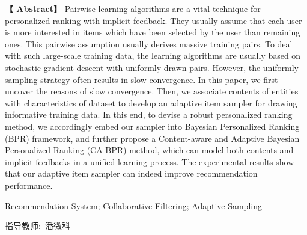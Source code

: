 \newpage

\centerline{\fangsong\bf{}}


\vskip 20bp

\hspace{4bp} {\textbf{【 Abstract】}} 
Pairwise learning algorithms are a vital technique
for personalized ranking with implicit feedback. They usually
assume that each user is more interested in items which have
been selected by the user than remaining ones. This pairwise
assumption usually derives massive training pairs. To deal with
such large-scale training data, the learning algorithms are usually
based on stochastic gradient descent with uniformly drawn pairs.
However, the uniformly sampling strategy often results in slow
convergence. In this paper, we first uncover the reasons of
slow convergence. Then, we associate contents of entities with
characteristics of dataset to develop an adaptive item sampler
for drawing informative training data. In this end, to devise a
robust personalized ranking method, we accordingly embed our
sampler into Bayesian Personalized Ranking (BPR) framework,
and further propose a Content-aware and Adaptive Bayesian
Personalized Ranking (CA-BPR) method, which can model both
contents and implicit feedbacks in a unified learning process. The
experimental results show that our adaptive item sampler can indeed improve recommendation performance.

\vskip 10bp

Recommendation System; Collaborative Filtering; Adaptive Sampling


\vskip 20bp

\begin{flushright}
	\kaishu 指导教师:\ 潘微科 \hspace{3cm}{ }
\end{flushright}

\label{lastpage}%